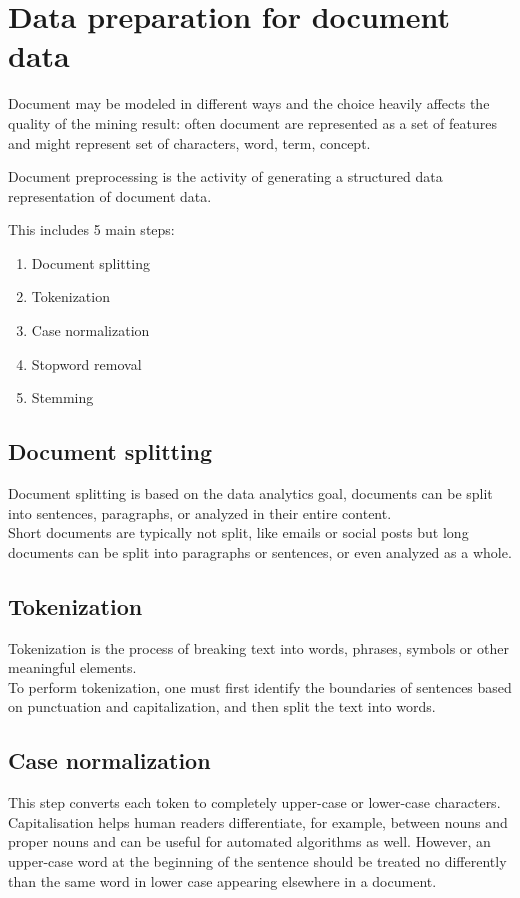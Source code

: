 \section{Data preparation for document data}

Document may be modeled in different ways and the choice heavily
affects the quality of the mining result: often document are
represented as a set of features and might represent set of
characters, word, term, concept. 
\begin{boxH}
  Document preprocessing is the activity of generating a structured
  data representation of document data.
\end{boxH}
This includes 5 main steps:
\begin{enumerate}
    \item Document splitting
    \item Tokenization
    \item Case normalization
    \item Stopword removal
    \item Stemming
\end{enumerate}
\subsection{Document splitting}
Document splitting is based on the data analytics goal, documents can
be split into sentences, paragraphs, or analyzed in their entire
content.\\
Short documents are typically not split, like emails or social posts
but long documents can be split into paragraphs or sentences, or even
analyzed as a whole.
\subsection{Tokenization}
Tokenization is the process of breaking text into words, phrases, 
symbols or other meaningful elements.\\
To perform tokenization, one must first identify the boundaries of 
sentences based on punctuation and capitalization, and then split the 
text into words.
\subsection{Case normalization}
This step converts each token to completely upper-case or lower-case
characters.\\
Capitalisation helps human readers differentiate, for example, between
nouns and proper nouns and can be useful for automated algorithms as
well. However, an upper-case word at the beginning of the sentence
should be treated no differently than the same word in lower case
appearing elsewhere in a document.
